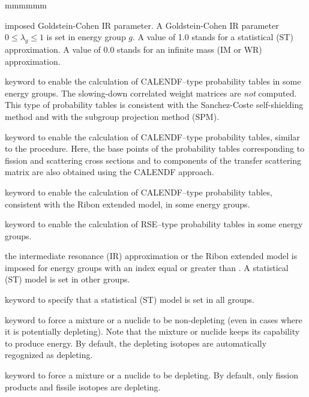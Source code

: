 \begin{ListeDeDescription}{mmmmmm}
\item[\dusa{gir}]  imposed Goldstein-Cohen IR parameter. A Goldstein-Cohen IR parameter
$0 \le \lambda_g\le 1$ is set in energy group $g$. A value of 1.0 stands for
a statistical (ST) approximation. A value of 0.0 stands for an infinite mass
(IM or WR) approximation.

\item[\moc{PT}] keyword to enable the calculation of CALENDF--type probability tables in some energy groups. The
slowing-down correlated weight matrices are {\sl not} computed. This type of probability tables is consistent
with the Sanchez-Coste self-shielding method and with the subgroup projection method (SPM).\cite{SPM09}

\item[\moc{PTMC}] keyword to enable the calculation of CALENDF--type probability tables, similar to the 
procedure. Here, the base points of the probability tables corresponding
to fission and scattering cross sections and to components of the transfer scattering matrix are also obtained using the CALENDF approach.

\item[\moc{PTSL}] keyword to enable the calculation of CALENDF--type probability tables, consistent
with the Ribon extended model, in some energy groups.

\item[\moc{RSE}] keyword to enable the calculation of RSE--type probability tables in some energy groups.

\item[\dusa{nir}]  the intermediate resonance (IR) approximation or the Ribon extended
model is imposed for energy groups with an index equal or greater than .
A statistical (ST) model is set in other groups.

\item[\moc{NONE}] keyword to specify that a statistical (ST) model is set in
all groups.

\item[\moc{NOEV}] keyword to force a mixture or a nuclide to be non-depleting (even in
cases where it is potentially depleting). Note that the mixture or nuclide keeps its
capability to produce energy. By default, the depleting isotopes are
automatically regognized as depleting.

\item[\moc{EVOL}] keyword to force a mixture or a nuclide to be depleting. By default, only fission products and
fissile isotopes are depleting.


\end{ListeDeDescription}
